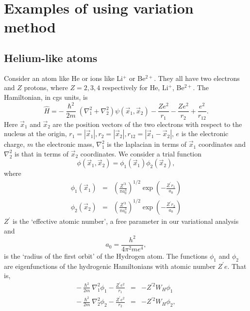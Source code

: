 \documentclass{article}
\numberwithin{equation}{section}
\begin{document}
\section{Examples of using variation method}\label{s3}
\subsection{Helium-like atoms}
Consider an atom like He or ions like Li$^{+}$ or Be$^{2+}$. They all have
two electrons and $Z$ protons, where $Z = 2, 3, 4$ respectively for He, Li$^{+}$,
Be$^{2+}$. The Hamiltonian, in cgs units, is
\begin{equation}\label{s3e1}
\hat{H} = -\frac{\hslash^2}{2m}\left(\nabla_1^2 + \nabla_2^2\right)\psi(\vec{x}_1, \vec{x}_2)
- \frac{Ze^2}{r_1} - \frac{Ze^2}{r_2} + \frac{e^2}{r_{12}}.
\end{equation}
Here $\vec{x}_1$ and $\vec{x}_2$ are the position vectors of the two electrons
with respect to the nucleus at the origin, $r_1 = |\vec{x}_1|, r_2 = |\vec{x}_2|,
r_{12} = |\vec{x}_1 - \vec{x}_2|$, $e$ is the electronic charge, $m$ the 
electronic mass, $\nabla_1^2$ is the laplacian in terms of $\vec{x}_1$ coordinates 
and $\nabla_2^2$ is that in terms of $\vec{x}_2$ coordinates. We consider a
trial function
\begin{equation}\label{s3e2}
\phi(\vec{x}_1, \vec{x}_2) = \phi_1(\vec{x}_1)\phi_2(\vec{x}_2),
\end{equation}
where
\begin{eqnarray}
\phi_1(\vec{x}_1) &=& \left(\frac{Z^{\prime 3}}{\pi a_0^3}\right)^{1/2}\exp\left(-\frac{Z^\prime r_1}{a_0}\right) \\
\phi_2(\vec{x}_2) &=& \left(\frac{Z^{\prime 3}}{\pi a_0^3}\right)^{1/2}\exp\left(-\frac{Z^\prime r_2}{a_0}\right)
\end{eqnarray}
$Z^\prime$ is the `effective atomic number', a free parameter in our variational
analysis and 
\begin{equation}\label{s3e5}
a_0 = \frac{h^2}{4\pi^2 me^4},
\end{equation}
is the `radius of the first orbit' of the Hydrogen atom. The functions $\phi_1$ 
and $\phi_2$ are eigenfunctions of the hydrogenic Hamiltonians with atomic
number $Z^\prime e$. That is,
\begin{eqnarray}
-\frac{\hslash^2}{2m}\nabla_1^2\phi_1 - \frac{Z^\prime e^2}{r_1} &=& -Z^{\prime 2}W_H\phi_1 \label{s3e6} \\
-\frac{\hslash^2}{2m}\nabla_2^2\phi_2 - \frac{Z^\prime e^2}{r_2} &=& -Z^{\prime 2}W_H\phi_2 \label{s3e7}, 
\end{eqnarray}
\end{document}
